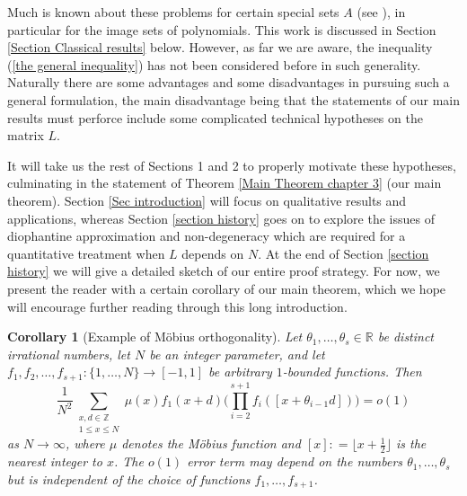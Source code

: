 \documentclass[12pt,a4paper,twoside,reqno]{amsart}
\newtheorem{Corollary}[Theorem]{Corollary}
\numberwithin{equation}{section}
\begin{document}
Much is known about these problems for certain special sets $A$ (see \cite{Ba67, Ba86, DaHe46, Ma87, Mu05, Pa02, Parsell02}), in particular for the image sets of polynomials. This work is discussed in Section \ref{Section Classical results} below. However, as far we are aware, the inequality (\ref{the general inequality}) has not been considered before in such generality. Naturally there are some advantages and some disadvantages in pursuing such a general formulation, the main disadvantage being that the statements of our main results must perforce include some complicated technical hypotheses on the matrix $L$.

 It will take us the rest of Sections 1 and 2 to properly motivate these hypotheses, culminating in the statement of Theorem \ref{Main Theorem chapter 3} (our main theorem). Section \ref{Sec introduction} will focus on qualitative results and applications, whereas Section \ref{section history} goes on to explore the issues of diophantine approximation and non-degeneracy which are required for a quantitative treatment when $L$ depends on $N$. At the end of Section \ref{section history} we will give a detailed sketch of our entire proof strategy. For now, we present the reader with a certain corollary of our main theorem, which we hope will encourage further reading through this long introduction.

\begin{Corollary}[Example of M\"{o}bius orthogonality]
\label{Corollary irrational szem mobius}
Let $\theta_1,\dots,\theta _s \in \mathbb{R}$ be distinct irrational numbers, let $N$ be an integer parameter, and let $f_1,f_2,\dots,f_{s+1}: \{ 1,\dots,N\} \longrightarrow [-1,1]$ be arbitrary $1$-bounded functions. Then 
\begin{equation}
\frac{1}{N^2} \sum\limits_{\substack{x,d \in \mathbb{Z} \\ 1 \leqslant x \leqslant N}} \mu(x) f_1(x+d)\Big (\prod\limits_{i=2}^{s+1} f_i([x + \theta_{i-1} d]) \Big ) = o(1)
\end{equation}
\noindent as $N \rightarrow \infty$, where $\mu$ denotes the M\"{o}bius function and $[x] : = \lfloor x + \frac{1}{2}\rfloor$ is the nearest integer to $x$. The $o(1)$ error term may depend on the numbers $\theta_1,\dots,\theta_s$ but is independent of the choice of functions $f_1,\dots,f_{s+1}$.\\  
\end{Corollary}
\end{document}
